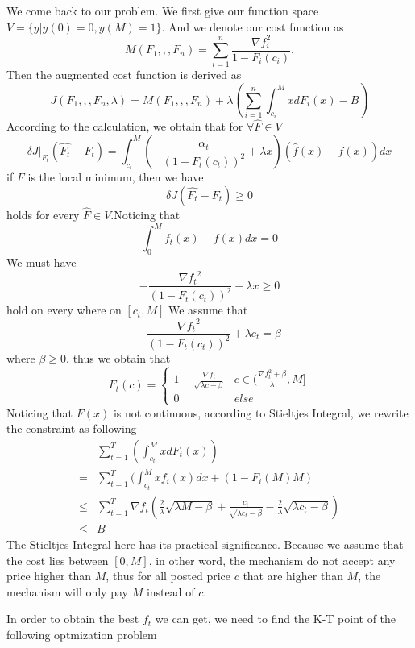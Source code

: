 \documentclass{article}
\begin{document}
We come back to our problem. We first give our function space $V=\{y|y(0)=0,y(M)=1\}$. And we denote our cost function as
\[M(F_1,,,F_n)= \sum_{i=1}^n \frac{\nabla f_i^2}{1-F_i(c_i)}.\]
Then the augmented cost function is derived as
\[J(F_1,,,F_n,\lambda)=M(F_1,,,F_n)+\lambda( \sum_{i=1}^n\int_{c_i}^MxdF_i(x)-B) \]
According to the calculation, we obtain that for $\forall \hat{F}\in V$
\[\delta J|_{F_t}(\hat{F_t}-F_t)=\int_{c_t}^M(-\frac{\alpha_t}{(1-F_t(c_t))^2}+\lambda x)(\hat{f}(x)-f(x))dx\]
if $\overline{F}$ is the local minimum, then we have
\[\delta J(\hat{F_t}-\overline{F_t})\geq 0\]
holds for every $\hat{F}\in V$.Noticing that
\[\int_0^Mf_t(x)-f(x)dx=0\]
We must have 
\[-\frac{{\nabla f_t}^2}{(1-F_t(c_t))^2}+\lambda x\geq 0\]
hold on every where on $[c_t,M]$
We assume that
\[-\frac{{\nabla f_t}^2}{(1-F_t(c_t))^2}+\lambda c_t= \beta \]
where $\beta \geq 0$. thus we obtain that
\begin{equation}
F_t(c)=\begin{cases}
  1-\frac{\nabla f_t}{\sqrt{\lambda c-\beta}} &c\in(\frac{\nabla f_t^2+\beta}{\lambda},M]  \\
  0 & else 
\end{cases}
\end{equation}
Noticing that $F(x)$ is not continuous, according to Stieltjes Integral, we rewrite the constraint as following
\begin{align*}
&\sum_{t=1}^T(\int_{c_t}^MxdF_t(x))\\
=&\sum_{t=1}^T(\int_{c_t}^Mxf_i(x)dx+(1-F_i(M)M)\\
\leq &\sum_{t=1}^T\nabla f_t (\frac{2}{\lambda}\sqrt{\lambda M-\beta}+\frac{c_t}{\sqrt{\lambda c_t-\beta}}-\frac{2}{\lambda}\sqrt{\lambda c_t-\beta})\\
\leq &B
\end{align*}
The Stieltjes Integral here has its practical significance. Because we assume that the cost lies between $[0,M]$, in other word, the mechanism do not accept any price higher than $M$, thus for all posted price $c$ that are higher than $M$, the mechanism will only pay $M$ instead of $c$.

In order to obtain the best $f_t$ we can get, we need to find the K-T point of the following optmization problem
\end{document}
